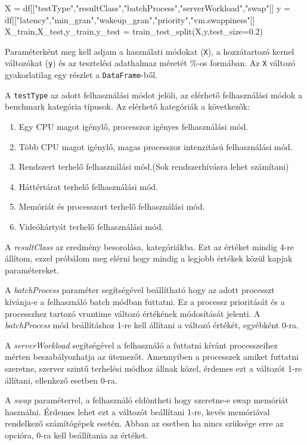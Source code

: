 \begin{python}
X = df[["testType","resultClass","batchProcess","serverWorkload","swap"]]
y = df[["latency","min_gran","wakeup_gran","priority","vm.swappiness"]]
X_train,X_test,y_train,y_test = train_test_split(X,y,test_size=0.2)
\end{python}

Paraméterként meg kell adjam a használati módokat (\texttt{X}), a hozzátartozó kernel változókat (\texttt{y}) és az tesztelési adathalmaz méretét \%-os formában.
Az \texttt{X} változó gyakorlatilag egy részlet a \texttt{DataFrame}-ből. %

A \texttt{testType} az adott felhasználási módot jelöli, az elérhető felhasználási módok a benchmark kategória típusok. Az elérhető kategóriák a következők: 
\begin{enumerate}
\item Egy CPU magot igénylő, processzor igényes felhasználási mód.
\item Több CPU magot igénylő, magas processzor intenzitású felhasználási mód.
\item Rendszert terhelő felhasználási mód.(Sok rendszerhívásra lehet számítani)
\item Háttértárat terhelő felhasználási mód.
\item Memóriát és processzort terhelő felhasználási mód.
\item Videókártyát terhelő felhasználási mód.
\end{enumerate}

A \textit{resultClass} az eredmény besorolása, kategóriákba. Ezt az értéket mindig 4-re állítom, ezzel próbálom meg elérni hogy mindig a legjobb értékek közül kapjak paramétereket.

A \textit{batchProcess} paraméter segítségével beállítható hogy az adott processzt kívánja-e a felhasználó batch módban futtatni. Ez a processz prioritását és a processzhez tartozó vruntime változó értékének módosítását jelenti. A \textit{batchProcess} mód beállításhoz 1-re kell állítani a változó értékét, egyébként 0-ra.

A \textit{serverWorkload} segítségével a felhasználó a futtatni kívánt processzeihez mérten beszabályozhatja az ütemezőt. Amennyiben a processzek amiket futtatni szeretne, szerver szintű terhelési módhoz állnak közel, érdemes ezt a változót 1-re állítani, ellenkező esetben 0-ra.

A \textit{swap} paraméterrel, a felhasználó eldöntheti hogy szeretne-e swap memóriát használni. Érdemes lehet ezt a változót beállítani 1-re, kevés memóriával rendelkező számítógépek esetén. Abban az esetben ha nincs szüksége erre az opcióra, 0-ra kell beállítania az értéket.

